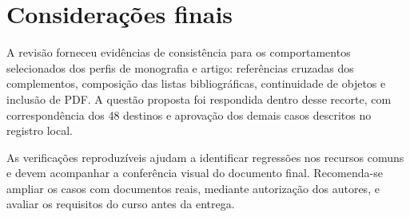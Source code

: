 \section{Considerações finais}

A revisão forneceu evidências de consistência para os comportamentos
selecionados dos perfis de monografia e artigo: referências cruzadas dos
complementos, composição das listas bibliográficas, continuidade de objetos
e inclusão de PDF. A questão proposta foi respondida dentro desse recorte,
com correspondência dos 48 destinos e aprovação dos demais casos descritos
no registro local.

As verificações reproduzíveis ajudam a identificar regressões nos recursos
comuns e devem acompanhar a conferência visual do documento final. Recomenda-se
ampliar os casos com documentos reais, mediante autorização dos autores, e
avaliar os requisitos do curso antes da entrega.
